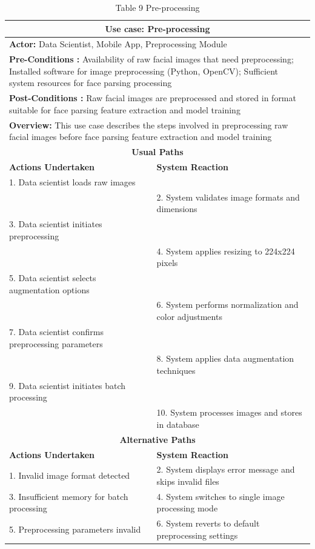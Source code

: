 \documentclass[12pt,a4paper]{report}
\begin{document}
\begin{table}[H]
\centering
\caption{Table 9 Pre-processing}
\begin{tabular}{|p{6cm}|p{6cm}|}
\hline
\multicolumn{2}{|c|}{\textbf{Use case: Pre-processing}} \\
\hline
\multicolumn{2}{|p{12cm}|}{\textbf{Actor:} Data Scientist, Mobile App, Preprocessing Module} \\
\hline
\multicolumn{2}{|p{12cm}|}{\textbf{Pre-Conditions :} Availability of raw facial images that need preprocessing; Installed software for image preprocessing (Python, OpenCV); Sufficient system resources for face parsing processing} \\
\hline
\multicolumn{2}{|p{12cm}|}{\textbf{Post-Conditions :} Raw facial images are preprocessed and stored in format suitable for face parsing feature extraction and model training} \\
\hline
\multicolumn{2}{|p{12cm}|}{\textbf{Overview:} This use case describes the steps involved in preprocessing raw facial images before face parsing feature extraction and model training} \\
\hline
\multicolumn{2}{|c|}{\textbf{Usual Paths}} \\
\hline
\textbf{Actions Undertaken} & \textbf{System Reaction} \\
\hline
1. Data scientist loads raw images & \\
\hline
 & 2. System validates image formats and dimensions \\
\hline
3. Data scientist initiates preprocessing & \\
\hline
 & 4. System applies resizing to 224x224 pixels \\
\hline
5. Data scientist selects augmentation options & \\
\hline
 & 6. System performs normalization and color adjustments \\
\hline
7. Data scientist confirms preprocessing parameters & \\
\hline
 & 8. System applies data augmentation techniques \\
\hline
9. Data scientist initiates batch processing & \\
\hline
 & 10. System processes images and stores in database \\
\hline
\multicolumn{2}{|c|}{\textbf{Alternative Paths}} \\
\hline
\textbf{Actions Undertaken} & \textbf{System Reaction} \\
\hline
1. Invalid image format detected & 2. System displays error message and skips invalid files \\
\hline
3. Insufficient memory for batch processing & 4. System switches to single image processing mode \\
\hline
5. Preprocessing parameters invalid & 6. System reverts to default preprocessing settings \\
\hline
\end{tabular}
\end{table}
\end{document}
